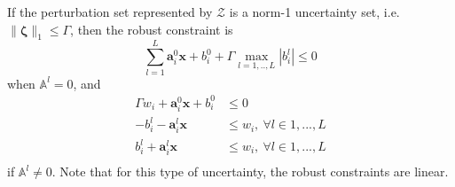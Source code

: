 If the perturbation set represented by $\mathcal{Z}$ is a norm-1 uncertainty set, i.e. $\|\mathbf{\zeta}\|_1 \leq \Gamma$,
then the robust constraint is
\begin{equation}
    \textstyle{\sum}_{l=1}^L \mathbf{a}^0_{i}\mathbf{x} + b^0_{i} + \Gamma \max_{l=1,..,L} |b^l_{i}| \leq 0
    \label{rom_coeff}
\end{equation}
when $\mathbb{A}^l = 0$, and
\begin{equation}
    \begin{split}
        \Gamma w_{i} + \mathbf{a}^0_{i}\mathbf{x} + b^0_{i} &\leq 0 \\
        - b^l_{i} - \mathbf{a}^l_{i}\mathbf{x} &\leq w_{i},~\forall l \in 1,...,L\\
        b^l_{i} + \mathbf{a}^l_{i}\mathbf{x} &\leq w_{i},~\forall l \in 1,...,L\\
    \end{split}
    \label{rom_linear}
\end{equation}
if $\mathbb{A}^l \neq 0$. Note that for this type of uncertainty, the robust constraints are linear.
